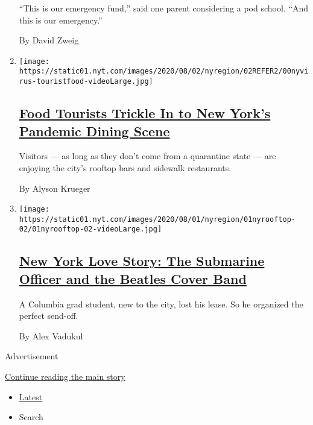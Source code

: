 \begin{enumerate}
  ``This is our emergency fund,'' said one parent considering a pod
  school. ``And this is our emergency.''

  By David Zweig
\item
  \texttt{[image: https://static01.nyt.com/images/2020/08/02/nyregion/02REFER2/00nyvirus-touristfood-videoLarge.jpg]}

  \hypertarget{food-tourists-trickle-in-to-new-yorks-pandemic-dining-scene}{%
  \subsection{\texorpdfstring{\href{/2020/07/30/nyregion/coronavirus-nyc-tourism-restaurants.html}{Food
  Tourists Trickle In to New York's Pandemic Dining
  Scene}}{Food Tourists Trickle In to New York's Pandemic Dining Scene}}\label{food-tourists-trickle-in-to-new-yorks-pandemic-dining-scene}}

  Visitors --- as long as they don't come from a quarantine state ---
  are enjoying the city's rooftop bars and sidewalk restaurants.

  By Alyson Krueger
\item
  \texttt{[image: https://static01.nyt.com/images/2020/08/01/nyregion/01nyrooftop-02/01nyrooftop-02-videoLarge.jpg]}

  \hypertarget{new-york-love-story-the-submarine-officer-and-the-beatles-cover-band}{%
  \subsection{\texorpdfstring{\href{/2020/07/30/nyregion/coronavirus-beatles-nyc.html}{New
  York Love Story: The Submarine Officer and the Beatles Cover
  Band}}{New York Love Story: The Submarine Officer and the Beatles Cover Band}}\label{new-york-love-story-the-submarine-officer-and-the-beatles-cover-band}}

  A Columbia grad student, new to the city, lost his lease. So he
  organized the perfect send-off.

  By Alex Vadukul
\end{enumerate}

Advertisement

\protect\hyperlink{after-mid1}{Continue reading the main story}

\begin{itemize}
\tightlist
\item
  \protect\hyperlink{stream-panel}{Latest}
\item
  Search
\end{itemize}

